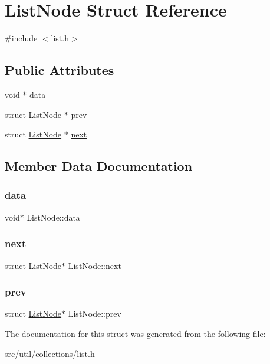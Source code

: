\hypertarget{structListNode}{}\section{List\+Node Struct Reference}
\label{structListNode}


{\ttfamily \#include $<$list.\+h$>$}

\subsection*{Public Attributes}
\begin{DoxyCompactItemize}
\item 
void $\ast$ \hyperlink{structListNode_a3e16de27e3b59aeb2f18aa35896edabe}{data}
\item 
struct \hyperlink{structListNode}{List\+Node} $\ast$ \hyperlink{structListNode_ac29aefb7627ded4e29dcb96b7a47f3f2}{prev}
\item 
struct \hyperlink{structListNode}{List\+Node} $\ast$ \hyperlink{structListNode_ac7af9e18e0586f13d59a52b3501ac4ca}{next}
\end{DoxyCompactItemize}


\subsection{Member Data Documentation}
\hypertarget{structListNode_a3e16de27e3b59aeb2f18aa35896edabe}{}\label{structListNode_a3e16de27e3b59aeb2f18aa35896edabe} 
\subsubsection{\texorpdfstring{data}{data}}
{\footnotesize\ttfamily void$\ast$ List\+Node\+::data}

\hypertarget{structListNode_ac7af9e18e0586f13d59a52b3501ac4ca}{}\label{structListNode_ac7af9e18e0586f13d59a52b3501ac4ca} 
\subsubsection{\texorpdfstring{next}{next}}
{\footnotesize\ttfamily struct \hyperlink{structListNode}{List\+Node}$\ast$ List\+Node\+::next}

\hypertarget{structListNode_ac29aefb7627ded4e29dcb96b7a47f3f2}{}\label{structListNode_ac29aefb7627ded4e29dcb96b7a47f3f2} 
\subsubsection{\texorpdfstring{prev}{prev}}
{\footnotesize\ttfamily struct \hyperlink{structListNode}{List\+Node}$\ast$ List\+Node\+::prev}



The documentation for this struct was generated from the following file\+:\begin{DoxyCompactItemize}
\item 
src/util/collections/\hyperlink{list_8h}{list.\+h}\end{DoxyCompactItemize}
